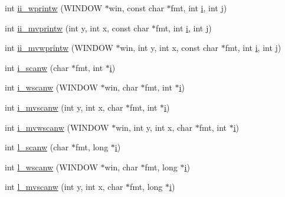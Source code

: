 \begin{DoxyCompactItemize}
int \hyperlink{C-macros_8c_ab8f1d3103aca01f9fdbbf7017ecf968b}{ii\+\_\+wprintw} (W\+I\+N\+D\+OW $\ast$win, const char $\ast$fmt, int \hyperlink{intro__blas1_83_8txt_a8ba82a50c0c2c12d5f6a77f7e4651c0b}{i}, int \hyperlink{exit_87_8txt_a8921ef29c441e427867c54bd3b2462ba}{j})
\item 
int \hyperlink{C-macros_8c_ada22ee1895688f4926d3109021e89e33}{ii\+\_\+mvprintw} (int y, int x, const char $\ast$fmt, int \hyperlink{intro__blas1_83_8txt_a8ba82a50c0c2c12d5f6a77f7e4651c0b}{i}, int \hyperlink{exit_87_8txt_a8921ef29c441e427867c54bd3b2462ba}{j})
\item 
int \hyperlink{C-macros_8c_aba1dee7f00e339e2bcd867896705bbf0}{ii\+\_\+mvwprintw} (W\+I\+N\+D\+OW $\ast$win, int y, int x, const char $\ast$fmt, int \hyperlink{intro__blas1_83_8txt_a8ba82a50c0c2c12d5f6a77f7e4651c0b}{i}, int \hyperlink{exit_87_8txt_a8921ef29c441e427867c54bd3b2462ba}{j})
\item 
int \hyperlink{C-macros_8c_a753154950200b717bb172493ec09eca0}{i\+\_\+scanw} (char $\ast$fmt, int $\ast$\hyperlink{intro__blas1_83_8txt_a8ba82a50c0c2c12d5f6a77f7e4651c0b}{i})
\item 
int \hyperlink{C-macros_8c_a3fcdb7ea0752fda8505aa52f2306619f}{i\+\_\+wscanw} (W\+I\+N\+D\+OW $\ast$win, char $\ast$fmt, int $\ast$\hyperlink{intro__blas1_83_8txt_a8ba82a50c0c2c12d5f6a77f7e4651c0b}{i})
\item 
int \hyperlink{C-macros_8c_a31b17f5fa08e8b64e9b314300f548c33}{i\+\_\+mvscanw} (int y, int x, char $\ast$fmt, int $\ast$\hyperlink{intro__blas1_83_8txt_a8ba82a50c0c2c12d5f6a77f7e4651c0b}{i})
\item 
int \hyperlink{C-macros_8c_ac0518e313ddc0b8e826cfb049c36e257}{i\+\_\+mvwscanw} (W\+I\+N\+D\+OW $\ast$win, int y, int x, char $\ast$fmt, int $\ast$\hyperlink{intro__blas1_83_8txt_a8ba82a50c0c2c12d5f6a77f7e4651c0b}{i})
\item 
int \hyperlink{C-macros_8c_ac941da9228821610096cdf7a8dc6af56}{l\+\_\+scanw} (char $\ast$fmt, long $\ast$\hyperlink{intro__blas1_83_8txt_a8ba82a50c0c2c12d5f6a77f7e4651c0b}{i})
\item 
int \hyperlink{C-macros_8c_ae2aa5264dfbd2042fa25e8e70bb445fe}{l\+\_\+wscanw} (W\+I\+N\+D\+OW $\ast$win, char $\ast$fmt, long $\ast$\hyperlink{intro__blas1_83_8txt_a8ba82a50c0c2c12d5f6a77f7e4651c0b}{i})
\item 
int \hyperlink{C-macros_8c_a27ab41c1f51bd6ad8029350446a577ea}{l\+\_\+mvscanw} (int y, int x, char $\ast$fmt, long $\ast$\hyperlink{intro__blas1_83_8txt_a8ba82a50c0c2c12d5f6a77f7e4651c0b}{i})
\item 

\end{DoxyCompactItemize}
